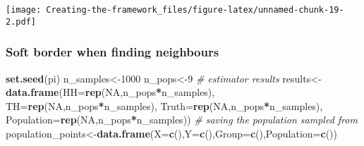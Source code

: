 \documentclass[
]{article}
\newenvironment{Shaded}{\begin{snugshade}}{\end{snugshade}}
\newcommand{\AttributeTok}[1]{\textcolor[rgb]{0.13,0.29,0.53}{#1}}
\newcommand{\CommentTok}[1]{\textcolor[rgb]{0.56,0.35,0.01}{\textit{#1}}}
\newcommand{\ConstantTok}[1]{\textcolor[rgb]{0.56,0.35,0.01}{#1}}
\newcommand{\DecValTok}[1]{\textcolor[rgb]{0.00,0.00,0.81}{#1}}
\newcommand{\FunctionTok}[1]{\textcolor[rgb]{0.13,0.29,0.53}{\textbf{#1}}}
\newcommand{\NormalTok}[1]{#1}
\newcommand{\OtherTok}[1]{\textcolor[rgb]{0.56,0.35,0.01}{#1}}
\newcommand{\SpecialCharTok}[1]{\textcolor[rgb]{0.81,0.36,0.00}{\textbf{#1}}}
\begin{document}
\texttt{[image: Creating-the-framework\_files/figure-latex/unnamed-chunk-19-2.pdf]}

\subsubsection{Soft border when finding
neighbours}\label{soft-border-when-finding-neighbours}

\begin{Shaded}
\begin{Highlighting}[]
\FunctionTok{set.seed}\NormalTok{(pi)}
\NormalTok{n\_samples}\OtherTok{\textless{}{-}}\DecValTok{1000}
\NormalTok{n\_pops}\OtherTok{\textless{}{-}}\DecValTok{9}
\CommentTok{\# estimator results}
\NormalTok{results}\OtherTok{\textless{}{-}}\FunctionTok{data.frame}\NormalTok{(}\AttributeTok{HH=}\FunctionTok{rep}\NormalTok{(}\ConstantTok{NA}\NormalTok{,n\_pops}\SpecialCharTok{*}\NormalTok{n\_samples),}
                    \AttributeTok{TH=}\FunctionTok{rep}\NormalTok{(}\ConstantTok{NA}\NormalTok{,n\_pops}\SpecialCharTok{*}\NormalTok{n\_samples),}
                    \AttributeTok{Truth=}\FunctionTok{rep}\NormalTok{(}\ConstantTok{NA}\NormalTok{,n\_pops}\SpecialCharTok{*}\NormalTok{n\_samples),}
                    \AttributeTok{Population=}\FunctionTok{rep}\NormalTok{(}\ConstantTok{NA}\NormalTok{,n\_pops}\SpecialCharTok{*}\NormalTok{n\_samples))}
\CommentTok{\# saving the population sampled from}
\NormalTok{population\_points}\OtherTok{\textless{}{-}}\FunctionTok{data.frame}\NormalTok{(}\AttributeTok{X=}\FunctionTok{c}\NormalTok{(),}\AttributeTok{Y=}\FunctionTok{c}\NormalTok{(),}\AttributeTok{Group=}\FunctionTok{c}\NormalTok{(),}\AttributeTok{Population=}\FunctionTok{c}\NormalTok{())}


\end{Highlighting}
\end{Shaded}
\end{document}
